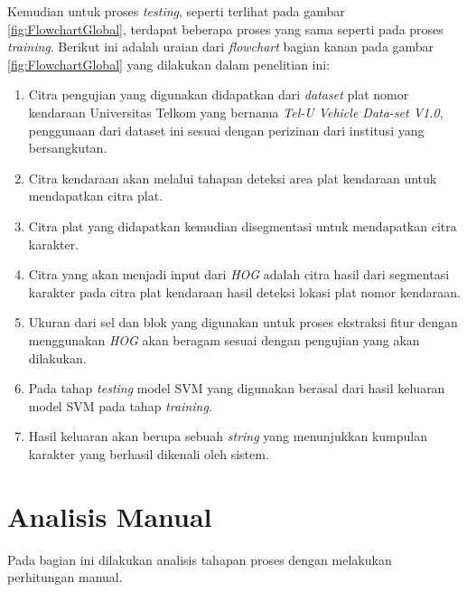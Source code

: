 \noindent Kemudian untuk proses \textit{testing}, seperti terlihat pada gambar \ref{fig:FlowchartGlobal}, terdapat beberapa proses yang sama seperti pada proses \textit{training}. Berikut ini adalah uraian dari \textit{flowchart} bagian kanan pada gambar \ref{fig:FlowchartGlobal} yang dilakukan dalam penelitian ini:
\begin{enumerate}
	\item Citra pengujian yang digunakan didapatkan dari \textit{dataset} plat nomor kendaraan Universitas Telkom yang bernama \textit{Tel-U Vehicle Data-set V1.0}, penggunaan dari dataset ini sesuai dengan perizinan dari institusi yang bersangkutan. 
	\item Citra kendaraan akan melalui tahapan deteksi area plat kendaraan untuk mendapatkan citra plat.
	\item Citra plat yang didapatkan kemudian disegmentasi untuk mendapatkan citra karakter. 
	\item Citra yang akan menjadi input dari \textit{HOG} adalah citra hasil dari segmentasi karakter pada citra plat kendaraan hasil deteksi lokasi plat nomor kendaraan.
	\item Ukuran dari sel dan blok yang digunakan untuk proses ekstraksi fitur dengan menggunakan \textit{HOG} akan beragam sesuai dengan pengujian yang akan dilakukan.
	\item Pada tahap \textit{testing} model SVM yang digunakan berasal dari hasil keluaran model SVM pada tahap \textit{training}.
	\item Hasil keluaran akan berupa sebuah \textit{string} yang menunjukkan kumpulan karakter yang berhasil dikenali oleh sistem.\\
\end{enumerate}

\section{Analisis Manual}
\noindent Pada bagian ini dilakukan analisis tahapan proses dengan melakukan perhitungan manual.\\

